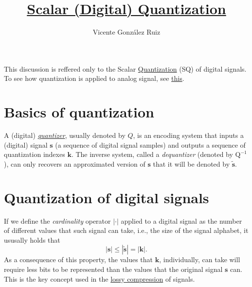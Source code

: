 
\title{\href{https://github.com/vicente-gonzalez-ruiz/scalar_quantization}{Scalar (Digital) Quantization}}

\author{Vicente González Ruiz}

\maketitle
\tableofcontents

This discussion is reffered only to the Scalar
\href{https://en.wikipedia.org/wiki/Quantization_(signal_processing)}{Quantization}
(SQ) of digital signals. To see how quantization is applied to analog
signal, see
\href{https://vicente-gonzalez-ruiz.github.io/analog_quantization/}{this}.

\section{Basics of quantization}

A (digital)
\href{https://en.wikipedia.org/wiki/Quantization_(signal_processing)}{\emph{quantizer}},
usually denoted by $Q$, is an encoding system that inputs a (digital)
signal $\mathbf{s}$ (a sequence of digital signal samples) and outputs
a sequence of quantization indexes ${\mathbf k}$. The inverse system,
called a \emph{dequantizer} (denoted by $\text{Q}^{-1}$), can
only recovers an approximated version of ${\mathbf s}$ that it will be
denoted by $\tilde{{\mathbf s}}$.


\section{Quantization of digital signals}

If we define the \emph{cardinality} operator $|\cdot|$ applied to a
digital signal as the number of different values that such signal can
take, i.e., the size of the signal alphabet, it ususally holds that
\begin{equation}
  |{\mathbf s}|\leq|\tilde{\mathbf s}| = |{\mathbf k}|.
\end{equation}
As a consequence of this property, the values that ${\mathbf k}$, individually,
can take will require less bits to be represented than the values that
the original signal ${\mathbf s}$ can. This is the key concept used in
the \href{https://en.wikipedia.org/wiki/Lossy_compression}{lossy
  compression} of signals.

